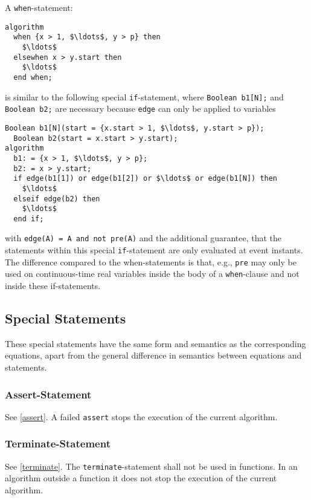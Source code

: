 A \lstinline!when!-statement:
\begin{lstlisting}[language=modelica]
algorithm
  when {x > 1, $\ldots$, y > p} then
    $\ldots$
  elsewhen x > y.start then
    $\ldots$
  end when;
\end{lstlisting}
is similar to the following special \lstinline!if!-statement, where \lstinline!Boolean b1[N];! and \lstinline!Boolean b2;! are necessary because \lstinline!edge! can only be applied to variables
\begin{lstlisting}[language=modelica]
  Boolean b1[N](start = {x.start > 1, $\ldots$, y.start > p});
  Boolean b2(start = x.start > y.start);
algorithm
  b1: = {x > 1, $\ldots$, y > p};
  b2: = x > y.start;
  if edge(b1[1]) or edge(b1[2]) or $\ldots$ or edge(b1[N]) then
    $\ldots$
  elseif edge(b2) then
    $\ldots$
  end if;
\end{lstlisting}
with \lstinline!edge(A) = A and not pre(A)! and the additional guarantee, that the statements within this special \lstinline!if!-statement are only evaluated at event instants.
The difference compared to the when-statements is that, e.g., \lstinline!pre! may only be used on continuous-time real variables inside the body of a \lstinline!when!-clause and not inside these if-statements.

\subsection{Special Statements}\label{special-statements}

These special statements have the same form and semantics as the corresponding equations, apart from the general difference in semantics between equations and statements.

\subsubsection{Assert-Statement}\label{assert-statement}

See \cref{assert}.
A failed \lstinline!assert! stops the execution of the current algorithm.

\subsubsection{Terminate-Statement}\label{terminate-statement}

See \cref{terminate}.
The \lstinline!terminate!-statement shall not be used in functions.
In an algorithm outside a function it does not stop the execution of the current algorithm.

